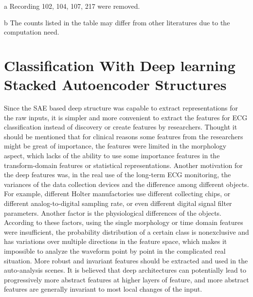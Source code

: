\documentclass[journal]{IEEEtran}
\begin{document}
\begin{table}[]
\begin{center}
\begin{threeparttable}
\begin{tabular}{cllllll}
\hline
\end{tabular}
\begin{tablenotes}
\item [a] Recording 102, 104, 107, 217 were removed.
\item [b] The counts listed in the table may differ from other literatures \cite{chaza} due to the computation need.
\end{tablenotes}
\end{threeparttable}

\end{center}
     \end{table}








\section{Classification With Deep learning Stacked Autoencoder Structures}
Since the SAE based deep structure was capable to extract representations for the raw inputs, it is simpler and more convenient to extract the features for ECG classification instead of discovery or create features by researchers. Thought it should be mentioned that for clinical reasons some features from the researchers might be great of importance, the features were limited in the morphology aspect, which lacks of the ability to use some importance features in the transform-domain features or statistical representations. Another motivation for the deep features was, in the real use of the long-term ECG monitoring, the variances of the data collection devices and the difference among different objects. For example, different Holter manufactories use different collecting chips, or different analog-to-digital sampling rate, or even different digital signal filter parameters. Another factor is the physiological differences of the objects. According to these factors, using the single morphology or time domain features were insufficient, the probability distribution of a certain class is nonexclusive and has variations over multiple directions in the feature space, which makes it impossible to analyze the waveform point by point in the complicated real situation. More robust and invariant features should be extracted and used in the auto-analysis scenes. It is believed that deep architectures can potentially lead to progressively more abstract features at higher layers of feature, and more abstract features are generally invariant to most local changes of the input\cite{bengio2013representation}.
\end{document}
